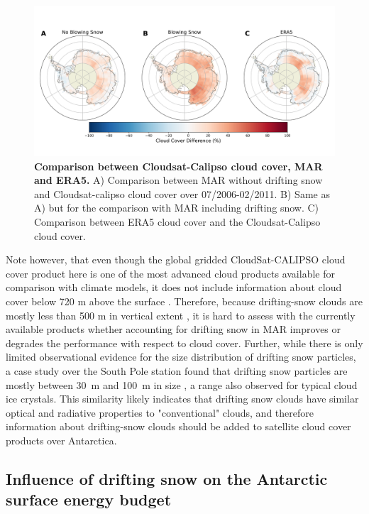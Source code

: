 \documentclass[draft]{agujournal2019}
\begin{document}
\begin{figure}[H]
	\includegraphics[width=1\textwidth]{Calipso_difference_new.png}
	\caption{\textbf{Comparison between Cloudsat-Calipso cloud cover, MAR and ERA5.} A) Comparison between MAR without drifting snow and Cloudsat-calipso cloud cover over 07/2006-02/2011. B) Same as A) but for the comparison with MAR including drifting snow. C) Comparison between ERA5 cloud cover and the Cloudsat-Calipso cloud cover.}
	\label{fig:sat}
\end{figure}


Note however, that even though the global gridded CloudSat-CALIPSO cloud cover product here is one of the most advanced cloud products available for comparison with climate models, it does not include information about cloud cover below 720 m above the surface \cite{kay2009}. Therefore, because drifting-snow clouds are mostly less than 500 m in vertical extent \cite{Palm2018}, it is hard to assess with the currently available products whether accounting for drifting snow in MAR improves or degrades the performance with respect to cloud cover. Further, while there is only limited observational evidence for the size distribution of drifting snow particles, a case study over the South Pole station found that drifting snow particles are mostly between 30~{\textmu}m and 100~{\textmu}m in size \cite{Lawson2006}, a range also observed for typical cloud ice crystals. This similarity likely indicates that drifting snow clouds have similar optical and radiative properties to "conventional" clouds, and therefore information about drifting-snow clouds should be added to satellite cloud cover products over Antarctica.

\subsection{Influence of drifting snow on the Antarctic surface energy budget}
\end{document}
